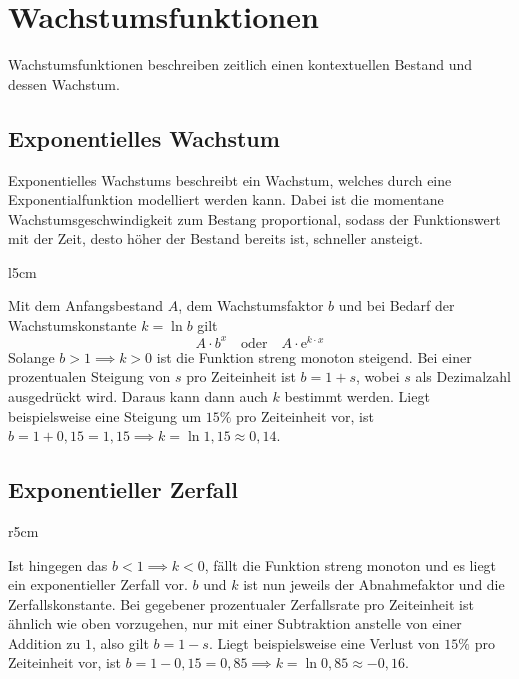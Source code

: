 \documentclass{article}
\begin{document}
 
\section{Wachstumsfunktionen}
Wachstumsfunktionen beschreiben zeitlich einen kontextuellen Bestand und dessen Wachstum.
\subsection{Exponentielles Wachstum}
Exponentielles Wachstums beschreibt ein Wachstum, welches durch eine Exponentialfunktion modelliert werden kann. Dabei ist die momentane Wachstumsgeschwindigkeit zum Bestang proportional, sodass der Funktionswert mit der Zeit, desto höher der Bestand bereits ist, schneller ansteigt.
\begin{wrapfigure}{l}{5cm}
  \centering
\end{wrapfigure} 
Mit dem Anfangsbestand $A$, dem Wachstumsfaktor $b$ und bei Bedarf der Wachstumskonstante $k=\ln{b}$ gilt
\[ 
 A \cdot b^x 
 \quad \text{oder} \quad 
 A \cdot \mathrm{e}^{k \cdot x}  
\] 
Solange ${b > 1 \implies k > 0}$ ist die Funktion streng monoton steigend. Bei einer prozentualen Steigung von $s$ pro Zeiteinheit ist ${b=1+s}$, wobei $s$ als Dezimalzahl ausgedrückt wird. Daraus kann dann auch $k$ bestimmt werden. \newline
Liegt beispielsweise eine Steigung um $15\%$ pro Zeiteinheit vor, ist ${b=1 + 0,15=1,15 \implies k=\ln{1,15} \approx 0,14}$. 
\newline 
\subsection{Exponentieller Zerfall}
\begin{wrapfigure}{r}{5cm}
  \centering
\end{wrapfigure}
Ist hingegen das ${b < 1 \implies k < 0}$, fällt die Funktion streng monoton und es liegt ein exponentieller Zerfall vor. $b$ und $k$ ist nun jeweils der Abnahmefaktor und die Zerfallskonstante. Bei gegebener prozentualer Zerfallsrate pro Zeiteinheit ist ähnlich wie oben vorzugehen, nur mit einer Subtraktion anstelle von einer Addition zu $1$, also gilt ${b=1-s}$. \newline
Liegt beispielsweise eine Verlust von $15\%$ pro Zeiteinheit vor, ist ${b=1-0,15=0,85 \implies k=\ln {0,85} \approx -0,16}$. \newline
 
\end{document}

